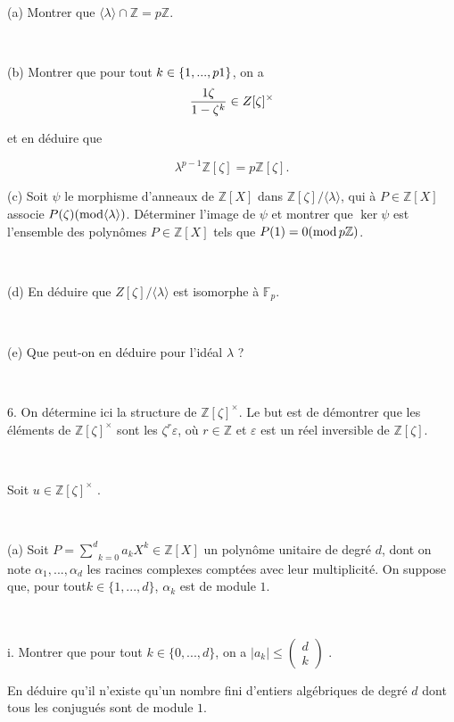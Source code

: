 \

\quad (a) Montrer que $\langle \lambda \rangle \cap \mathbb{Z}= p\mathbb{Z}$.

\

\quad (b) Montrer que pour tout $k \in \{1, . . ., p \nonconverted{minus}
1\}$, on a
\[ \frac{1 \nonconverted{minus} \zeta}{1 - \zeta^k} \in Z [\zeta]^{\times} \]


et en d{\'e}duire que


\[ \lambda^{p - 1} \mathbb{Z}[\zeta] = p\mathbb{Z}[\zeta] . \]


\quad (c) Soit $\psi$ le morphisme d'anneaux de $\mathbb{Z}[X]$ dans
$\mathbb{Z} [\zeta] / \langle \lambda \rangle$, qui {\`a} $P \in
\mathbb{Z}[X]$ associe $P (\zeta) (\tmop{mod} \langle \lambda \rangle)$.
D{\'e}terminer l'image de $\psi$ et montrer que $\ker \psi$ est l'ensemble des
polyn{\^o}mes $P \in \mathbb{Z}[X]$ tels que $P (1) = 0 (\tmop{mod}
p\mathbb{Z})$.

\

\quad (d) En d{\'e}duire que $Z [\zeta] / \langle \lambda \rangle$ est
isomorphe {\`a} $\mathbb{F}_p$.

\

\quad (e) Que peut-on en d{\'e}duire pour l'id{\'e}al $\lambda$ ?

\

6. On d{\'e}termine ici la structure de $\mathbb{Z}[\zeta]^{\times}$. Le but
est de d{\'e}montrer que les {\'e}l{\'e}ments de $\mathbb{Z}[\zeta]^{\times}$
sont les $\zeta^r \varepsilon$, o{\`u} $r \in \mathbb{Z}$ et $\varepsilon$ est
un r{\'e}el inversible de $\mathbb{Z}[\zeta]$.

\

Soit $u \in \mathbb{Z}[\zeta]^{\times}$ .

\

\quad (a) Soit $P = \underset{k = 0}{\overset{d}{\sum}} a_k X^k \in
\mathbb{Z}[X]$ un polyn{\^o}me unitaire de degr{\'e} $d$, dont on note
$\alpha_1, . . ., \alpha_d$ les racines complexes compt{\'e}es avec leur
multiplicit{\'e}. On suppose que, pour tout$k \in \{1, . . ., d\}$, $\alpha_k$
est de module $1$.

\

{\hspace{3em}}i. Montrer que pour tout $k \in \{0, . . ., d\}$, on a $|a_k |
\leqslant \left( \begin{array}{c}
  d\\
  k
\end{array} \right)$ .

{\hspace{3em}}En d{\'e}duire qu'il n'existe qu'un nombre fini d'entiers
alg{\'e}briques de degr{\'e} $d$ dont tous les conjugu{\'e}s sont de module
$1$.

